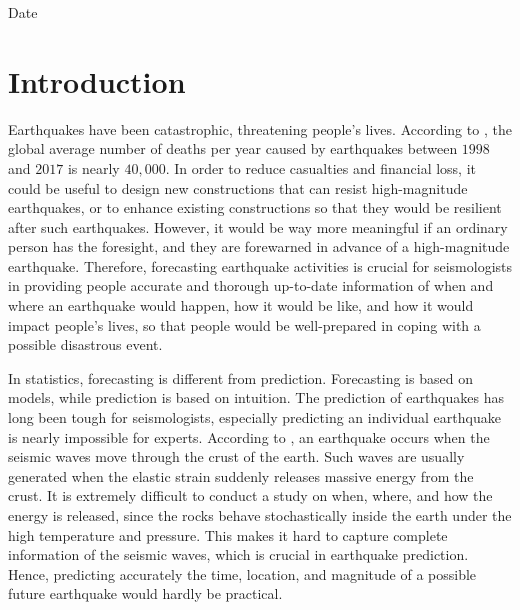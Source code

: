 \documentclass[11pt,twoside]{article}
\numberwithin{Theorem}{section}
\numberwithin{Definition}{section}
\numberwithin{Lemma}{section}
\numberwithin{Algorithm}{section}
\numberwithin{equation}{section}
\newcommand{\dottedline}[1]{\makebox[#1]{.\dotfill}}
\begin{document}
\vspace{5mm}

Date \dottedline{8cm}


\clearpage



% 


\pagestyle{plain}
\setcounter{page}{1}

\tableofcontents
\clearpage
\listoftables
\listoffigures
\cleardoublepage

\setcounter{page}{1}

\nocite{*}

\clearpage



\section{Introduction}
\label{sec:intro}
Earthquakes have been catastrophic, threatening people's lives. According to \cite{Earthquakes}, the global average number of deaths per year caused by earthquakes between $1998$ and $2017$ is nearly $40,000$. In order to reduce casualties and financial loss, it could be useful to design new constructions that can resist high-magnitude earthquakes, or to enhance existing constructions so that they would be resilient after such earthquakes. However, it would be way more meaningful if an ordinary person has the foresight, and they are forewarned in advance of a high-magnitude earthquake. Therefore, forecasting earthquake activities is crucial for seismologists in providing people accurate and thorough up-to-date information of when and where an earthquake would happen, how it would be like, and how it would impact people's lives, so that people would be well-prepared in coping with a possible disastrous event.

In statistics, forecasting is different from prediction. Forecasting is based on models, while prediction is based on intuition. The prediction of earthquakes has long been tough for seismologists, especially predicting an individual 
earthquake is nearly impossible for experts. According to \cite{britannicaEarthquakeDefinition}, an earthquake occurs when the seismic waves move through the crust of the earth. Such waves are usually generated when the elastic strain suddenly releases massive energy from the crust. It is extremely difficult to conduct a study on when, where, and how the energy is released, since the rocks behave stochastically inside the earth under the high temperature and pressure. This makes it hard to capture complete information of the seismic waves, which is crucial in earthquake prediction. Hence, predicting accurately the time, location, and magnitude of a possible future earthquake would hardly be practical.
\end{document}
